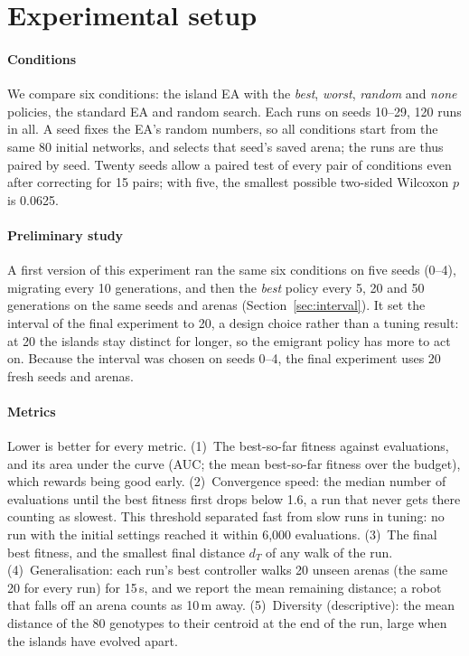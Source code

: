 \documentclass[sigconf]{acmart}
\begin{document}
\section{Experimental setup}
\label{sec:setup}

\paragraph{Conditions} We compare six conditions: the island EA with the \emph{best},
\emph{worst}, \emph{random} and \emph{none} policies, the standard EA and
random search. Each runs on seeds 10--29, 120 runs in all. A seed fixes the
EA's random numbers, so all conditions start from the same 80 initial
networks, and selects that seed's saved arena; the runs are thus paired by
seed. Twenty seeds allow a paired test of every pair of conditions even after
correcting for 15 pairs; with five, the smallest possible two-sided Wilcoxon
$p$ is 0.0625.

\paragraph{Preliminary study} A first version of this experiment ran the same
six conditions on five seeds (0--4), migrating every 10 generations, and then
the \emph{best} policy every 5, 20 and 50 generations on the same seeds and
arenas (Section~\ref{sec:interval}). It set the interval of the final
experiment to 20, a design choice rather than a tuning result: at 20 the
islands stay distinct for longer, so the emigrant policy has more to act on. Because the
interval was chosen on seeds 0--4, the final experiment uses 20 fresh seeds
and arenas.

\paragraph{Metrics} Lower is better for every metric.
(1)~The best-so-far fitness against evaluations, and its area under the curve
(AUC; the mean best-so-far fitness over the budget), which rewards being good
early.
(2)~Convergence speed: the median number of evaluations until the best
fitness first drops below 1.6, a run that never gets there counting as
slowest. This threshold
separated fast from slow runs in tuning: no run with the initial settings
reached it within 6{,}000 evaluations.
(3)~The final best fitness, and the smallest final distance $d_T$ of any walk
of the run.
(4)~Generalisation: each run's best controller walks 20 unseen arenas (the
same 20 for every run) for 15\,s, and we report the mean remaining distance;
a robot that falls off an arena counts as 10\,m away.
(5)~Diversity (descriptive): the mean distance of the 80 genotypes to their
centroid at the end of the run, large when the islands have evolved apart.
\end{document}
